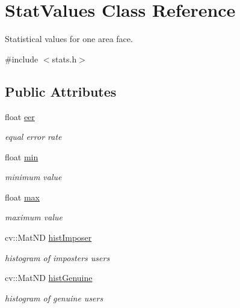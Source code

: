 \hypertarget{class_stat_values}{\section{Stat\+Values Class Reference}
\label{class_stat_values}
}


Statistical values for one area face.  




{\ttfamily \#include $<$stats.\+h$>$}

\subsection*{Public Attributes}
\begin{DoxyCompactItemize}
\item 
\hypertarget{class_stat_values_a00ff7743eac61e7c44dab952328d9984}{float \hyperlink{class_stat_values_a00ff7743eac61e7c44dab952328d9984}{eer}}\label{class_stat_values_a00ff7743eac61e7c44dab952328d9984}

\begin{DoxyCompactList}\small\item\em equal error rate \end{DoxyCompactList}\item 
\hypertarget{class_stat_values_a89b677e2a9473ee056fe4555210163d9}{float \hyperlink{class_stat_values_a89b677e2a9473ee056fe4555210163d9}{min}}\label{class_stat_values_a89b677e2a9473ee056fe4555210163d9}

\begin{DoxyCompactList}\small\item\em minimum value \end{DoxyCompactList}\item 
\hypertarget{class_stat_values_aa93010a22cbc54ff0d279e64cb32bacd}{float \hyperlink{class_stat_values_aa93010a22cbc54ff0d279e64cb32bacd}{max}}\label{class_stat_values_aa93010a22cbc54ff0d279e64cb32bacd}

\begin{DoxyCompactList}\small\item\em maximum value \end{DoxyCompactList}\item 
\hypertarget{class_stat_values_a0fdd3e75e850e123b99908a5158330ea}{cv\+::\+Mat\+N\+D \hyperlink{class_stat_values_a0fdd3e75e850e123b99908a5158330ea}{hist\+Imposer}}\label{class_stat_values_a0fdd3e75e850e123b99908a5158330ea}

\begin{DoxyCompactList}\small\item\em histogram of imposters users \end{DoxyCompactList}\item 
\hypertarget{class_stat_values_a76bf29a6593db35717fd27036cc4ffd9}{cv\+::\+Mat\+N\+D \hyperlink{class_stat_values_a76bf29a6593db35717fd27036cc4ffd9}{hist\+Genuine}}\label{class_stat_values_a76bf29a6593db35717fd27036cc4ffd9}

\begin{DoxyCompactList}\small\item\em histogram of genuine users \end{DoxyCompactList}\end{DoxyCompactItemize}


